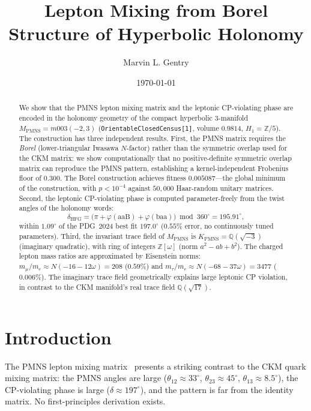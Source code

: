 \documentclass[11pt,a4paper]{article}
\theoremstyle{definition}
\newcommand{\MPMNS}{M_{\mathrm{PMNS}}}
\newcommand{\KPMNS}{K_{\mathrm{PMNS}}}
\newcommand{\Zom}{\mathbb{Z}[\omega]}
\newcommand{\Zfive}{\mathbb{Z}/5}
\begin{document}
\title{Lepton Mixing from Borel Structure of Hyperbolic Holonomy}

\author[1]{Marvin L. Gentry}
\date{\today}

\begin{abstract}
We show that the PMNS lepton mixing matrix and the leptonic
CP-violating phase are encoded in the holonomy geometry of the compact
hyperbolic 3-manifold $\MPMNS = m003(-2,3)$
(\texttt{OrientableClosedCensus[1]}, volume $0.9814$,
$H_1=\Zfive$).
The construction has three independent results.
First, the PMNS matrix requires the \emph{Borel} (lower-triangular
Iwasawa $N$-factor) rather than the symmetric overlap used for the CKM
matrix: we show computationally that no positive-definite symmetric
overlap matrix can reproduce the PMNS pattern, establishing a
kernel-independent Frobenius floor of $0.300$.
The Borel construction achieves fitness $0.005087$---the global
minimum of the construction, with $p<10^{-4}$ against
$50{,}000$ Haar-random unitary matrices.
Second, the leptonic CP-violating phase is computed parameter-freely
from the twist angles of the holonomy words:
\[
  \delta_{\mathrm{HFG}}
  = \bigl(\pi + \varphi(\mathrm{aaB}) + \varphi(\mathrm{baa})\bigr)
    \bmod 360^\circ
  = 195.91^\circ,
\]
within $1.09^\circ$ of the PDG~2024 best fit $197.0^\circ$
($0.55\%$ error, no continuously tuned parameters).
Third, the invariant trace field of $\MPMNS$ is
$\KPMNS = \mathbb{Q}(\sqrt{-3})$ (imaginary quadratic), with ring
of integers $\Zom$ (norm $a^2-ab+b^2$).
The charged lepton mass ratios are approximated by Eisenstein norms:
$m_\mu/m_e\approx N(-16-12\omega)=208$ ($0.59\%$) and
$m_\tau/m_e\approx N(-68-37\omega)=3477$ ($0.006\%$).
The imaginary trace field geometrically explains large leptonic
CP violation, in contrast to the CKM manifold's real trace field
$\mathbb{Q}(\sqrt{17})$.
\end{abstract}

\maketitle
\tableofcontents

\section{Introduction}
\label{sec:intro}

The PMNS lepton mixing matrix~\cite{Maki1962,PDG2024} presents a
striking contrast to the CKM quark mixing matrix: the PMNS angles are
large ($\theta_{12}\approx33^\circ$, $\theta_{23}\approx45^\circ$,
$\theta_{13}\approx8.5^\circ$), the CP-violating phase is large
($\delta\approx197^\circ$), and the pattern is far from the identity
matrix. No first-principles derivation exists.
\end{document}
